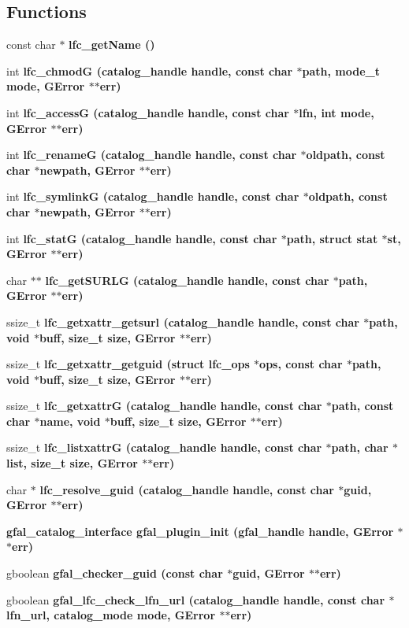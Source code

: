 \subsection*{Functions}
\begin{CompactItemize}
\item 
const char $\ast$ \bf{lfc\_\-get\-Name} ()
\item 
int \bf{lfc\_\-chmod\-G} (catalog\_\-handle handle, const char $\ast$path, mode\_\-t mode, GError $\ast$$\ast$err)
\item 
int \bf{lfc\_\-access\-G} (catalog\_\-handle handle, const char $\ast$lfn, int mode, GError $\ast$$\ast$err)
\item 
int \bf{lfc\_\-rename\-G} (catalog\_\-handle handle, const char $\ast$oldpath, const char $\ast$newpath, GError $\ast$$\ast$err)
\item 
int \bf{lfc\_\-symlink\-G} (catalog\_\-handle handle, const char $\ast$oldpath, const char $\ast$newpath, GError $\ast$$\ast$err)
\item 
int \bf{lfc\_\-stat\-G} (catalog\_\-handle handle, const char $\ast$path, struct stat $\ast$st, GError $\ast$$\ast$err)
\item 
char $\ast$$\ast$ \bf{lfc\_\-get\-SURLG} (catalog\_\-handle handle, const char $\ast$path, GError $\ast$$\ast$err)
\item 
ssize\_\-t \bf{lfc\_\-getxattr\_\-getsurl} (catalog\_\-handle handle, const char $\ast$path, void $\ast$buff, size\_\-t size, GError $\ast$$\ast$err)
\item 
ssize\_\-t \bf{lfc\_\-getxattr\_\-getguid} (struct lfc\_\-ops $\ast$ops, const char $\ast$path, void $\ast$buff, size\_\-t size, GError $\ast$$\ast$err)
\item 
ssize\_\-t \bf{lfc\_\-getxattr\-G} (catalog\_\-handle handle, const char $\ast$path, const char $\ast$name, void $\ast$buff, size\_\-t size, GError $\ast$$\ast$err)
\item 
ssize\_\-t \bf{lfc\_\-listxattr\-G} (catalog\_\-handle handle, const char $\ast$path, char $\ast$list, size\_\-t size, GError $\ast$$\ast$err)
\item 
char $\ast$ \bf{lfc\_\-resolve\_\-guid} (catalog\_\-handle handle, const char $\ast$guid, GError $\ast$$\ast$err)
\item 
\bf{gfal\_\-catalog\_\-interface} \bf{gfal\_\-plugin\_\-init} (gfal\_\-handle handle, GError $\ast$$\ast$err)
\item 
gboolean \bf{gfal\_\-checker\_\-guid} (const char $\ast$guid, GError $\ast$$\ast$err)
\item 
gboolean \bf{gfal\_\-lfc\_\-check\_\-lfn\_\-url} (catalog\_\-handle handle, const char $\ast$lfn\_\-url, catalog\_\-mode mode, GError $\ast$$\ast$err)
\end{CompactItemize}
